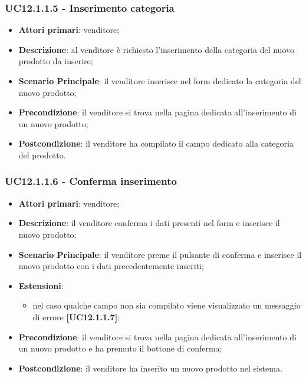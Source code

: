 \subsubsection{UC12.1.1.5 - Inserimento categoria}
\begin{itemize}
\item \textbf{Attori primari}: venditore;
\item \textbf{Descrizione}: al venditore è richiesto l'inserimento della categoria del nuovo prodotto da inserire;
\item \textbf{Scenario Principale}: il venditore inserisce nel form dedicato la categoria del nuovo prodotto;
\item \textbf{Precondizione}: il venditore si trova nella pagina dedicata all'inserimento di un nuovo prodotto;
\item \textbf{Postcondizione}: il venditore ha compilato il campo dedicato alla categoria del prodotto.
\end{itemize}

\subsubsection{UC12.1.1.6 - Conferma inserimento}
\begin{itemize}
\item \textbf{Attori primari}: venditore;
\item \textbf{Descrizione}: il venditore conferma i dati presenti nel form e inserisce il nuovo prodotto;
\item \textbf{Scenario Principale}: il venditore preme il pulsante di conferma e inserisce il nuovo prodotto con i dati precedentemente inseriti;
\item \textbf{Estensioni}: 
\begin{itemize}
\item nel caso qualche campo non sia compilato viene visualizzato un messaggio di errore \textbf{[UC12.1.1.7]};
\end{itemize} 
\item \textbf{Precondizione}: il venditore si trova nella pagina dedicata all'inserimento di un nuovo prodotto e ha premuto il bottone di conferma;
\item \textbf{Postcondizione}: il venditore ha inserito un nuovo prodotto nel sistema.
\end{itemize}

